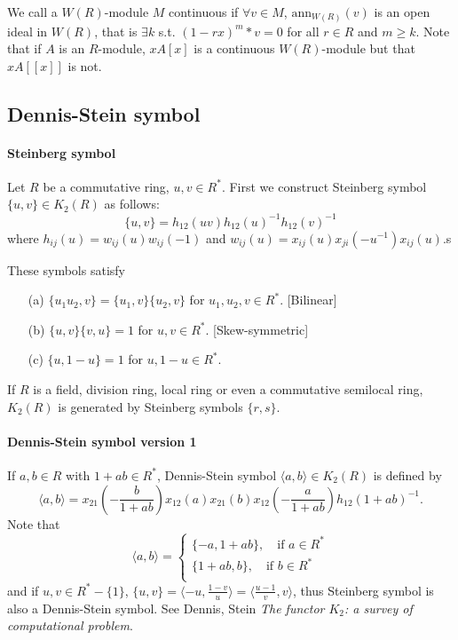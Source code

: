 We call a $W(R)$-module $M$ continuous if $\forall v \in M$, $\textrm{ann}_{W(R)}(v)$ is an open ideal in $W(R)$, that is $\exists k$ s.t. $(1-rx)^m *v =0$ for all $r\in R$ and $m\geqslant k$. Note that if $A$ is an $R$-module, $xA[x]$ is a continuous $W(R)$-module but that $xA[[x]]$ is not.

\subsection{Dennis-Stein symbol} %
\label{sub:dennis_stein_symbols}
\paragraph{Steinberg symbol} %
\label{par:steinberg_symbol}


Let $R$ be a commutative ring, $u,v\in R^*$. First we construct Steinberg symbol $\{u,v\}\in K_2(R)$ as follows:
\[\{u,v\}=h_{12}(uv)h_{12}(u)^{-1}h_{12}(v)^{-1}\]
where $h_{ij}(u)=w_{ij}(u)w_{ij}(-1)$ and $w_{ij}(u)=x_{ij}(u)x_{ji}(-u^{-1})x_{ij}(u)$.s

These symbols satisfy
\begin{itemize}
	\item[(a)] $\{u_1u_2,v\}=\{u_1,v\}\{u_2,v\}$ for $u_1,u_2,v\in R^*$. [Bilinear]\\
	\item[(b)] $\{u,v\}\{v,u\}=1$ for $u,v \in R^*$. [Skew-symmetric]\\
	\item[(c)] $\{u,1-u\}=1$ for $u,1-u\in R^*$.
\end{itemize}
\begin{theorem}
	If $R$ is a field, division ring, local ring or even a commutative semilocal ring, $K_2(R)$ is generated by Steinberg symbols $\{r,s\}$.
\end{theorem}
\paragraph{Dennis-Stein symbol {\color{green}version 1}} %
\label{par:dennis_stein_symbol_greenversion_1}
If $a,b\in R$ with $1+ab \in R^*$, Dennis-Stein symbol $\langle a,b \rangle \in K_2(R)$ is defined by 
\[\langle a,b \rangle = x_{21}(-\frac{b}{1+ab})x_{12}(a)x_{21}(b)x_{12}(-\frac{a}{1+ab})h_{12}(1+ab)^{-1}.\]
Note that 
\[\langle a,b \rangle = \begin{cases}
	\{-a,1+ab\},\quad \mbox{if $a\in R^*$}\\
	\{1+ab,b\},\quad \mbox{if $b\in R^*$}\\
\end{cases}\]
and if $u,v\in R^*-\{1\}$, $\{u,v\}=\langle -u, \frac{1-v}{u} \rangle = \langle \frac{u-1}{v},v\rangle$, thus Steinberg symbol is also a Dennis-Stein symbol. See Dennis, Stein \emph{The functor $K_2$: a survey of computational problem}.


